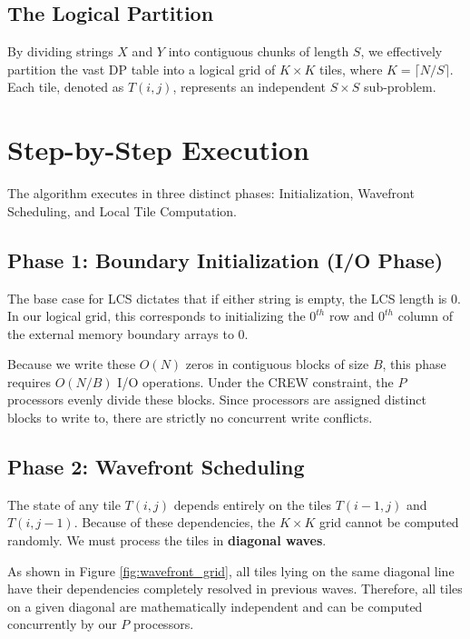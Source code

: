 \subsection{The Logical Partition}
By dividing strings $X$ and $Y$ into contiguous chunks of length $S$, we effectively partition the vast DP table into a logical grid of $K \times K$ tiles, where $K = \lceil N/S \rceil$. Each tile, denoted as $T(i, j)$, represents an independent $S \times S$ sub-problem.

\section{Step-by-Step Execution}

The algorithm executes in three distinct phases: Initialization, Wavefront Scheduling, and Local Tile Computation.

\subsection{Phase 1: Boundary Initialization (I/O Phase)}
The base case for LCS dictates that if either string is empty, the LCS length is 0. In our logical grid, this corresponds to initializing the $0^{th}$ row and $0^{th}$ column of the external memory boundary arrays to 0. 

Because we write these $O(N)$ zeros in contiguous blocks of size $B$, this phase requires $O(N/B)$ I/O operations. Under the CREW constraint, the $P$ processors evenly divide these blocks. Since processors are assigned distinct blocks to write to, there are strictly no concurrent write conflicts.

\subsection{Phase 2: Wavefront Scheduling}
The state of any tile $T(i, j)$ depends entirely on the tiles $T(i-1, j)$ and $T(i, j-1)$. Because of these dependencies, the $K \times K$ grid cannot be computed randomly. We must process the tiles in \textbf{diagonal waves}. 

As shown in Figure \ref{fig:wavefront_grid}, all tiles lying on the same diagonal line have their dependencies completely resolved in previous waves. Therefore, all tiles on a given diagonal are mathematically independent and can be computed concurrently by our $P$ processors.

